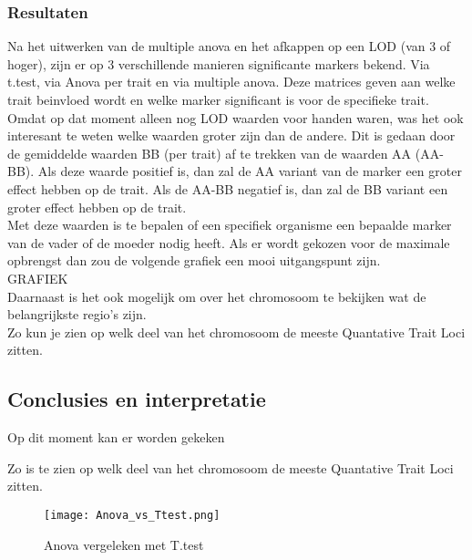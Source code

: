 \documentclass[12pt,a4paper]{article}
\begin{document}
\subsubsection*{Resultaten}
Na het uitwerken van de multiple anova en het afkappen op een LOD (van 3 of hoger), zijn er op 3 verschillende manieren significante markers bekend. 
Via t.test, via Anova per trait en via multiple anova. 
Deze matrices geven aan welke trait beinvloed wordt en welke marker significant is voor de specifieke trait.
Omdat  op dat moment alleen nog LOD waarden voor handen waren, was het ook interesant te weten welke waarden groter zijn dan de andere. 
Dit is gedaan door de gemiddelde waarden BB (per trait) af te trekken van de waarden AA (AA-BB).
Als deze waarde positief is, dan zal de AA variant van de marker een groter effect hebben op de trait. 
Als de AA-BB negatief is, dan zal de BB variant een groter effect hebben op de trait. \\
Met deze waarden is te bepalen of een specifiek organisme een bepaalde marker van de vader of de moeder nodig heeft.
Als er wordt gekozen voor de maximale opbrengst dan zou de volgende grafiek een mooi uitgangspunt zijn.\\
GRAFIEK\\
Daarnaast is het ook mogelijk om over het chromosoom te bekijken wat de belangrijkste regio's zijn.\\
Zo kun je zien op welk deel van het chromosoom de meeste Quantative Trait Loci zitten.
\subsection*{Conclusies en interpretatie}
Op dit moment kan er worden gekeken 




Zo is te zien op welk deel van het chromosoom de meeste Quantative Trait Loci zitten.
\pagebreak

\listoffigures
\pagebreak

\begin{figure}
\vspace{-6cm}
\hspace{-1.5cm}
\texttt{[image: Anova\_vs\_Ttest.png]}
\caption{Anova vergeleken met T.test}
\FloatBarrier
\end{figure}
\end{document}
